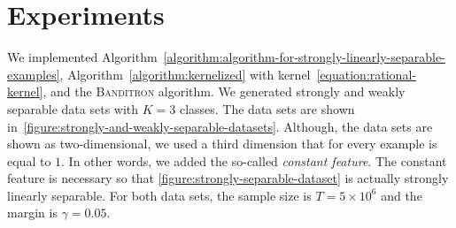 \section{Experiments}
\label{section:experiments}

We implemented
Algorithm~\ref{algorithm:algorithm-for-strongly-linearly-separable-examples},
Algorithm~\ref{algorithm:kernelized} with
kernel~\eqref{equation:rational-kernel}, and the \textsc{Banditron} algorithm.
We generated strongly and weakly separable data sets with $K=3$ classes. The
data sets are shown in~\autoref{figure:strongly-and-weakly-separable-datasets}.
Although, the data sets are shown as two-dimensional, we used a third dimension
that for every example is equal to $1$. In other words, we added the so-called
\emph{constant feature}. The constant feature is necessary so that
\autoref{figure:strongly-separable-dataset} is actually strongly linearly
separable. For both data sets, the sample size is $T=5\times 10^6$ and the
margin is $\gamma=0.05$.

